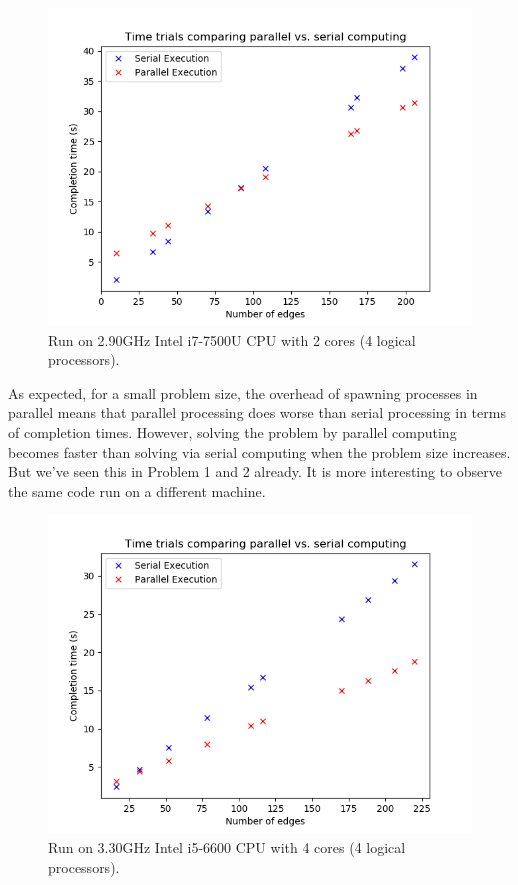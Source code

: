 \documentclass[12pt]{article}
\begin{document}
\begin{figure}[H]
	\includegraphics[scale=1]{Problem3-TimeTrial.png}
	\caption{Run on 2.90GHz Intel i7-7500U CPU with 2 cores (4 logical processors).}
\end{figure}

As expected, for a small problem size, the overhead of spawning processes in parallel means that parallel processing does worse than serial processing in terms of completion times. However, solving the problem by parallel computing becomes faster than solving via serial computing when the problem size increases. But we've seen this in Problem 1 and 2 already. It is more interesting to observe the same code run on a different machine.

\begin{figure}[H]
	\includegraphics[scale=1]{Problem3-4cores.png}
	\caption{Run on 3.30GHz Intel i5-6600 CPU with 4 cores (4 logical processors).}
\end{figure}
\end{document}

